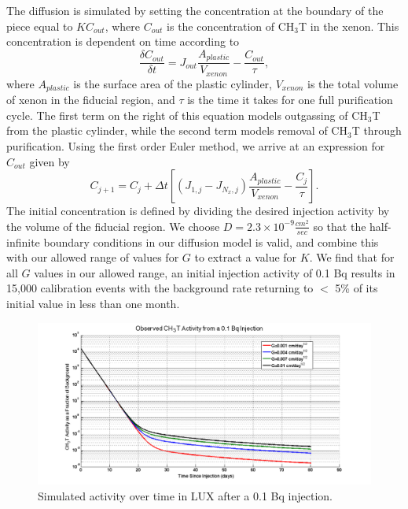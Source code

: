 The diffusion is simulated by setting the concentration at the boundary of the piece equal to $KC_{out}$, where $C_{out}$ is the concentration of CH$_3$T in the xenon.  This concentration is dependent on time according to
\[\frac{\delta C_{out}}{\delta t} = J_{out} \frac{A_{plastic}}{V_{xenon}}-\frac{C_{out}}{\tau},\]
where $A_{plastic}$ is the surface area of the plastic cylinder, $V_{xenon}$ is the total volume of xenon in the fiducial region, and $\tau$ is the time it takes for one full purification cycle.  The first term on the right of this equation models outgassing of CH$_3$T from the plastic cylinder, while the second term models removal of CH$_3$T through purification.  Using the first order Euler method, we arrive at an expression for $C_{out}$ given by
\[C_{j+1}=C_j + \Delta t [(J_{1,j}-J_{N_x,j})\frac{A_{plastic}}{V_{xenon}}-\frac{C_j}{\tau}].\]
The initial concentration is defined by dividing the desired injection activity by the volume of the fiducial region.  We choose $D = 2.3 \times 10^{-9} \frac {cm^2}{sec}$ so that the half-infinite boundary conditions in our diffusion model is valid, and combine this with our allowed range of values for $G$ to extract a value for $K$.  We find that for all $G$ values in our allowed range, an initial injection activity of 0.1 Bq results in 15,000 calibration events with the background rate returning to $<$ 5\% of its initial value in less than one month. 

\begin{figure}[H]
\centering
\includegraphics[scale=0.15]{LUXActivityOverTime_new.png}
\caption{Simulated activity over time in LUX after a 0.1 Bq injection.}
\label{fig:LUXActivity}
\end{figure}